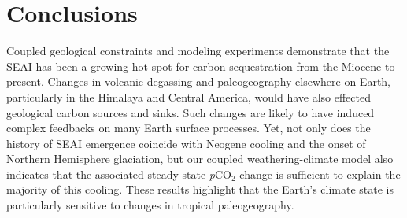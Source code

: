 \documentclass[9pt,twocolumn,twoside,lineno]{pnas-new}
\newcommand{\pCOtwo}{\textit{p}CO$_{2}$\xspace}
\begin{document}
\section*{Conclusions}

Coupled geological constraints and modeling experiments demonstrate that the SEAI has been a growing hot spot for carbon sequestration from the Miocene to present. Changes in volcanic degassing and paleogeography elsewhere on Earth, particularly in the Himalaya and Central America, would have also effected geological carbon sources and sinks. Such changes are likely to have induced complex feedbacks on many Earth surface processes. Yet, not only does the history of SEAI emergence coincide with Neogene cooling and the onset of Northern Hemisphere glaciation, but our coupled weathering-climate model also indicates that the associated steady-state \pCOtwo change is sufficient to explain the majority of this cooling. These results highlight that the Earth's climate state is particularly sensitive to changes in tropical paleogeography.
\end{document}
